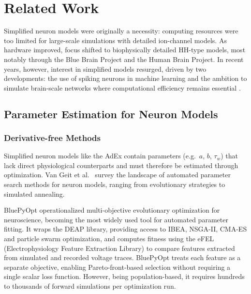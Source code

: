 \section{Related Work}\label{ch:relwork}

Simplified neuron models were originally a necessity: computing resources were too limited for large-scale simulations with detailed ion-channel models.
As hardware improved, focus shifted to biophysically detailed \gls{HH}-type models, most notably through the Blue Brain Project \cite{VanGeit2016} and the Human Brain Project\cite{Amunts2016}.
In recent years, however, interest in simplified models resurged, driven by two developments: the use of spiking neurons in machine learning \cite{Neftci2019} and the ambition to simulate brain-scale networks where computational efficiency remains essential \cite{Tesler2024}.

\subsection{Parameter Estimation for Neuron Models}\label{sec:rw:param-estimation}

\subsubsection{Derivative-free Methods}
Simplified neuron models like the \gls{AdEx} contain parameters (e.g.\ $a$, $b$, $\tau_w$) that lack direct physiological counterparts and must therefore be estimated through optimization.
Van Geit et al.\ \cite{VanGeit2008} survey the landscape of automated parameter search methods for neuron models, ranging from evolutionary strategies to simulated annealing.

BluePyOpt \cite{VanGeit2016} operationalized multi-objective evolutionary optimization for neuroscience, becoming the most widely used tool for automated parameter fitting.
It wraps the DEAP library, providing access to IBEA, NSGA-II, CMA-ES and particle swarm optimization, and computes fitness using the eFEL (Electrophysiology Feature Extraction Library) to compare features extracted from simulated and recorded voltage traces.
BluePyOpt treats each feature as a separate objective, enabling Pareto-front-based selection without requiring a single scalar loss function.
However, being population-based, it requires hundreds to thousands of forward simulations per optimization run.

